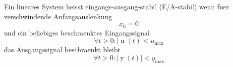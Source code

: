 Ein lineares System heisst eingangs-ausgang-stabil (E/A-stabil) wenn fuer verschwindende Anfangsauslenkung
$$x_0 = 0$$
und ein beliebiges beschraenktes Eingangssignal 
$$\forall t > 0 : | \operatorname{u}(t) < u_{\mathrm{max}}$$
das Ausgangssignal beschraenkt bleibt
$$\forall t > 0 : | \operatorname{y}(t) | < y_{\mathrm{max}}$$

